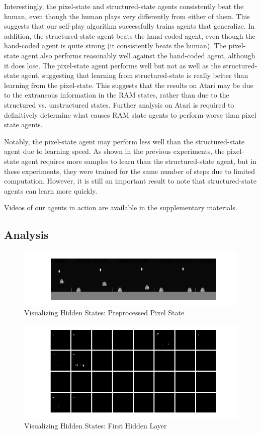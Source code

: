 \documentclass[10pt,twocolumn,letterpaper]{article}
\begin{document}
Interestingly, the pixel-state and structured-state agents consistently beat the
human, even though the human plays very differently from either of them. This
suggests that our self-play algorithm successfully trains agents that
generalize. In addition, the structured-state agent beats the hand-coded
agent, even though the hand-coded agent is quite strong (it consistently beats
the human). The pixel-state agent also performs reasonably well against the
hand-coded agent, although it does lose. The pixel-state agent performs well
but not as well as the structured-state agent, suggesting that learning from
structured-state is really better than learning from the pixel-state. This
suggests that the results on Atari may be due to the extraneous information in
the RAM states, rather than due to the structured vs. unstructured states.
Further analysis on Atari is required to definitively determine what causes
RAM state agents to perform worse than pixel state agents.

Notably, the pixel-state agent may perform less well than the structured-state
agent due to learning speed. As shown in the previous experiments, the
pixel-state agent requires more samples to learn than the structured-state
agent, but in these experiments, they were trained for the same number of
steps due to limited computation. However, it is still an important result to
note that structured-state agents can learn more quickly.

Videos of our agents in action are available in the supplementary materials.

\subsection{Analysis}

\begin{figure}[H]
\center
\includegraphics[width=\columnwidth]{preprocess}
\caption{
Visualizing Hidden States: Preprocessed Pixel State
}\label{fig:preprocess}
\end{figure}

\begin{figure}[H]
\center
\includegraphics[width=\columnwidth]{layer1}
\caption{
Visualizing Hidden States: First Hidden Layer
}\label{fig:layer1}
\end{figure}
\end{document}
